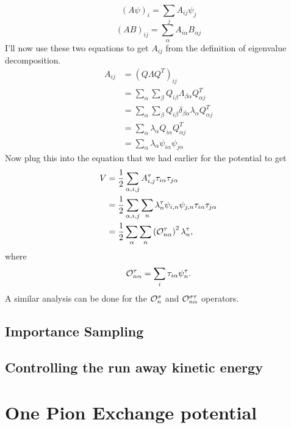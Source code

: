 \begin{equation}
   (A\psi)_i = \sum\limits_jA_{ij}\psi_j
\end{equation}
\begin{equation}
   (AB)_{ij}=\sum\limits_\alpha A_{i\alpha} B_{\alpha j}
\end{equation}
I'll now use these two equations to get $A_{ij}$ from the definition of eigenvalue decomposition.
\begin{align}
   A_{ij} &= \left(Q\Lambda Q^T\right)_{ij} \\
   &=\sum\limits_\alpha\sum\limits_\beta Q_{i\beta}\Lambda_{\beta\alpha}Q^T_{\alpha j} \\
   &=\sum\limits_\alpha\sum\limits_\beta Q_{i\beta}\delta_{\beta\alpha}\lambda_\alpha Q^T_{\alpha j} \\
   &=\sum\limits_\alpha \lambda_\alpha Q_{i\alpha}Q^T_{\alpha j} \\
   &=\sum\limits_\alpha \lambda_\alpha \psi_{i\alpha}\psi_{j\alpha}
\end{align}
Now plug this into the equation that we had earlier for the potential to get
\begin{align}
   V &= \frac{1}{2}\sum\limits_{\alpha,i,j} A^{\tau}_{i,j}\tau_{i\alpha}\tau_{j\alpha} \\
   &= \frac{1}{2}\sum\limits_{\alpha,i,j}\sum\limits_n\lambda_n^\tau\psi_{i,n}\psi_{j,n}\tau_{i\alpha}\tau_{j\alpha} \\
   &= \frac{1}{2}\sum\limits_\alpha\sum\limits_n\left(\mathcal{O}^\tau_{n\alpha}\right)^2\lambda^\tau_n,
   \label{equ:Vtau}
\end{align}
where
\begin{equation}
   \mathcal{O}^\tau_{n\alpha} = \sum\limits_i \tau_{i\alpha}\psi^\tau_n.
\end{equation}
A similar analysis can be done for the $\mathcal{O}^\sigma_{n}$ and $\mathcal{O}^{\sigma\tau}_{n\alpha}$ operators.

\subsection{Importance Sampling}

\subsection{Controlling the run away kinetic energy}


\section{One Pion Exchange potential}
